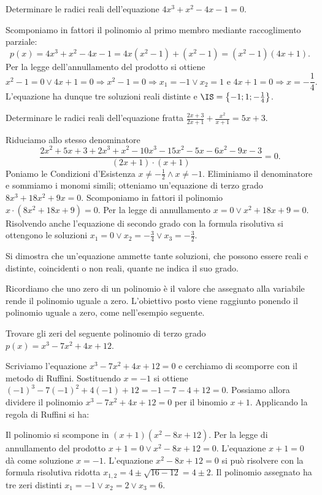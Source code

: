 \begin{exrig}
\begin{esempio}
Determinare le radici reali dell’equazione $4x^3+x^2-4x-1=0$.

Scomponiamo in fattori il polinomio al primo membro mediante raccoglimento parziale: 
\[p(x)=4x^3+x^2-4x-1=4x \left(x^2-1\right)+\left(x^2-1\right)=\left(x^2-1\right) (4x+1).\] 
Per la legge dell’annullamento del prodotto si ottiene 
\[x^2-1=0\vee 4x+1=0 \Rightarrow x^2-1=0\Rightarrow x_1=-1\vee x_2=1\text{ e }4x+1=0\Rightarrow x=-\frac{1}{4}.\] L'equazione ha dunque tre soluzioni reali distinte e $\IS=\left\{-1;1;-\frac 1 4\right\}$.
\end{esempio}
\begin{esempio}
Determinare le radici reali dell’equazione fratta $\frac{2x+3}{2x+1}+\frac{x^2}{x+1}=5x+3$.

Riduciamo allo stesso denominatore 
\[\frac{2x^2+5x+3+2x^3+x^2-10x^3-15x^2-5x-6x^2-9x-3}{(2x+1)\cdot (x+1)}=0.\]
Poniamo le Condizioni d’Esistenza $x\neq -\frac 1 2\wedge x\neq -1$. Eliminiamo il denominatore e sommiamo i monomi simili; otteniamo un'equazione di terzo grado $8x^3+18x^2+9x=0$. Scomponiamo in fattori il polinomio $x\cdot \left(8x^2+18x+9\right)=0$. Per la legge di annullamento $x=0\vee x^2+18x+9=0$. Risolvendo anche l'equazione di secondo grado con la formula risolutiva si ottengono le soluzioni $x_1=0\vee x_2=-\frac 3 4\vee x_3=-\frac 3 2$.

\osservazione
Si dimostra che un'equazione ammette tante soluzioni, che possono essere reali e distinte, coincidenti o non reali, quante ne indica il suo grado.

Ricordiamo che uno zero di un polinomio è il valore che assegnato alla variabile rende il polinomio uguale a zero. L’obiettivo posto viene raggiunto ponendo il polinomio uguale a zero, come nell’esempio seguente.
\end{esempio}

\begin{esempio}
Trovare gli zeri del seguente polinomio di terzo grado $p(x)=x^3-7x^2+4x+12$.

Scriviamo l’equazione $x^3-7x^2+4x+12=0$ e cerchiamo di scomporre con il metodo di Ruffini. Sostituendo $x=-1$ si ottiene $(-1)^3-7(-1)^2+4(-1)+12=-1-7-4+12=0$. Possiamo allora dividere il polinomio $x^3-7x^2+4x+12=0$ per il binomio $x+1$. Applicando la regola di Ruffini si ha:
\begin{center}

\end{center}
Il polinomio si scompone in $(x+1)(x^2-8x+12)$. Per la legge di annullamento del prodotto $x+1=0\vee x^2-8x+12=0$. L'equazione $x+1=0$ dà come soluzione $x=-1$. L'equazione $x^2-8x+12=0$ si può risolvere con la formula risolutiva ridotta $x_{1,2}=4\pm \sqrt{16-12}=4\pm 2$. Il polinomio assegnato ha tre zeri distinti $x_1=-1\vee x_2=2\vee x_3=6$.
\end{esempio}
\end{exrig}
\ovalbox{\risolvii \ref{ese:5.1}, \ref{ese:5.2}, \ref{ese:5.3}, \ref{ese:5.4}, \ref{ese:5.5}, \ref{ese:5.6}, \ref{ese:5.7}, \ref{ese:5.8}, \ref{ese:5.9}, \ref{ese:5.10}, \ref{ese:5.11}}

